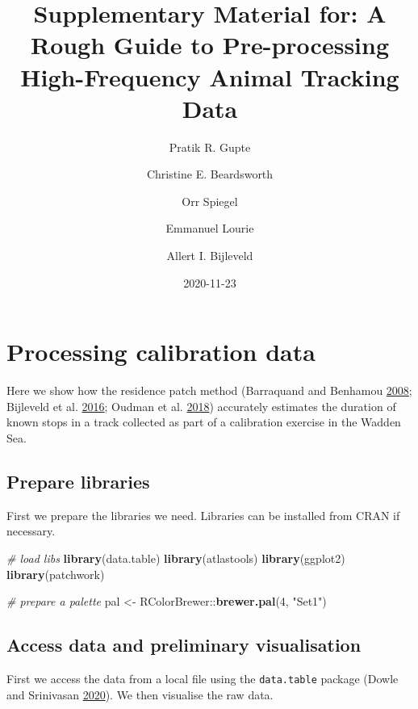 \documentclass[
]{scrartcl}
\title{Supplementary Material for: A Rough Guide to Pre-processing High-Frequency Animal Tracking Data}
\author{Pratik R. Gupte \and Christine E. Beardsworth \and Orr Spiegel \and Emmanuel Lourie \and Allert I. Bijleveld}
\date{2020-11-23}
\newenvironment{Shaded}{}{}
\newcommand{\CommentTok}[1]{\textcolor[rgb]{0.38,0.63,0.69}{\textit{#1}}}
\newcommand{\DecValTok}[1]{\textcolor[rgb]{0.25,0.63,0.44}{#1}}
\newcommand{\KeywordTok}[1]{\textcolor[rgb]{0.00,0.44,0.13}{\textbf{#1}}}
\newcommand{\NormalTok}[1]{#1}
\newcommand{\OperatorTok}[1]{\textcolor[rgb]{0.40,0.40,0.40}{#1}}
\newcommand{\StringTok}[1]{\textcolor[rgb]{0.25,0.44,0.63}{#1}}
\begin{document}
\maketitle

{
\setcounter{tocdepth}{2}
\tableofcontents
}
\hypertarget{processing-calibration-data}{%
\section{Processing calibration data}\label{processing-calibration-data}}

Here we show how the residence patch method (Barraquand and Benhamou \protect\hyperlink{ref-barraquand2008}{2008}; Bijleveld et al. \protect\hyperlink{ref-bijleveld2016}{2016}; Oudman et al. \protect\hyperlink{ref-oudman2018}{2018}) accurately estimates the duration of known stops in a track collected as part of a calibration exercise in the Wadden Sea.

\hypertarget{prepare-libraries}{%
\subsection{Prepare libraries}\label{prepare-libraries}}

First we prepare the libraries we need. Libraries can be installed from CRAN if necessary.

\begin{Shaded}
\begin{Highlighting}[]
\CommentTok{\# load libs}
\KeywordTok{library}\NormalTok{(data.table)}
\KeywordTok{library}\NormalTok{(atlastools)}
\KeywordTok{library}\NormalTok{(ggplot2)}
\KeywordTok{library}\NormalTok{(patchwork)}

\CommentTok{\# prepare a palette}
\NormalTok{pal <{-}}\StringTok{ }\NormalTok{RColorBrewer}\OperatorTok{::}\KeywordTok{brewer.pal}\NormalTok{(}\DecValTok{4}\NormalTok{, }\StringTok{"Set1"}\NormalTok{)}
\end{Highlighting}
\end{Shaded}

\hypertarget{access-data-and-preliminary-visualisation}{%
\subsection{Access data and preliminary visualisation}\label{access-data-and-preliminary-visualisation}}

First we access the data from a local file using the \texttt{data.table} package (Dowle and Srinivasan \protect\hyperlink{ref-dowle2020}{2020}).
We then visualise the raw data.
\end{document}
